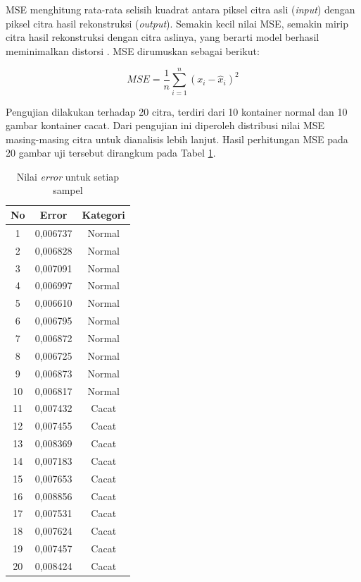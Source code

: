 MSE menghitung rata-rata selisih kuadrat antara piksel citra asli
(\textit{input}) dengan piksel citra hasil rekonstruksi
(\textit{output}). Semakin
kecil nilai MSE, semakin mirip citra hasil rekonstruksi dengan citra
aslinya, yang berarti model berhasil meminimalkan distorsi
\citep{27}. MSE dirumuskan sebagai berikut:

\begin{equation}
  MSE = \frac{1}{n} \sum_{i=1}^{n} (x_i - \hat{x}_i)^2
\end{equation}

Pengujian dilakukan terhadap 20 citra, terdiri dari 10 kontainer
normal dan 10 gambar kontainer cacat. Dari pengujian ini diperoleh
distribusi nilai MSE masing-masing citra untuk dianalisis lebih
lanjut. Hasil perhitungan MSE pada 20 gambar uji tersebut dirangkum
pada Tabel \ref{tab:error-samples}.

\begin{table}[H]
  \centering
  \caption{Nilai \textit{error} untuk setiap sampel}
  \label{tab:error-samples}
  \begin{tabular}{ccc}
    \toprule
    \textbf{No} & \textbf{Error} & \textbf{Kategori} \\
    \midrule
    1  & 0,006737 & Normal \\
    2  & 0,006828 & Normal \\
    3  & 0,007091 & Normal \\
    4  & 0,006997 & Normal \\
    5  & 0,006610 & Normal \\
    6  & 0,006795 & Normal \\
    7  & 0,006872 & Normal \\
    8  & 0,006725 & Normal \\
    9  & 0,006873 & Normal \\
    10 & 0,006817 & Normal \\
    11 & 0,007432 & Cacat \\
    12 & 0,007455 & Cacat \\
    13 & 0,008369 & Cacat \\
    14 & 0,007183 & Cacat \\
    15 & 0,007653 & Cacat \\
    16 & 0,008856 & Cacat \\
    17 & 0,007531 & Cacat \\
    18 & 0,007624 & Cacat \\
    19 & 0,007457 & Cacat \\
    20 & 0,008424 & Cacat \\
    \bottomrule
  \end{tabular}
\end{table}

